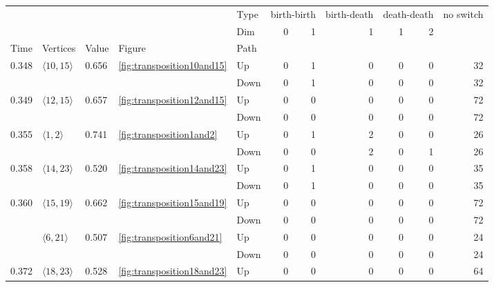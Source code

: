 \documentclass{article}
\begin{document}
\begin{center}
\begin{tabular}{lllllrrrrrr}
\toprule
 &  &  &  & Type & \multicolumn{2}{r}{birth-birth} & birth-death & \multicolumn{2}{r}{death-death} & no switch \\
 &  &  &  & Dim & 0 & 1 & 1 & 1 & 2 &  \\
Time & Vertices & Value & Figure & Path &  &  &  &  &  &  \\
\midrule
\multirow[t]{2}{*}{0.348} & \multirow[t]{2}{*}{$\langle10, 15\rangle$} & \multirow[t]{2}{*}{0.656} & \multirow[t]{2}{*}{\ref{fig:transposition10and15}} & Up & 0 & 1 & 0 & 0 & 0 & 32 \\
 &  &  &  & Down & 0 & 1 & 0 & 0 & 0 & 32 \\
\cline{1-11} \cline{2-11} \cline{3-11} \cline{4-11}
\multirow[t]{2}{*}{0.349} & \multirow[t]{2}{*}{$\langle12, 15\rangle$} & \multirow[t]{2}{*}{0.657} & \multirow[t]{2}{*}{\ref{fig:transposition12and15}} & Up & 0 & 0 & 0 & 0 & 0 & 72 \\
 &  &  &  & Down & 0 & 0 & 0 & 0 & 0 & 72 \\
\cline{1-11} \cline{2-11} \cline{3-11} \cline{4-11}
\multirow[t]{2}{*}{0.355} & \multirow[t]{2}{*}{$\langle1, 2\rangle$} & \multirow[t]{2}{*}{0.741} & \multirow[t]{2}{*}{\ref{fig:transposition1and2}} & Up & 0 & 1 & 2 & 0 & 0 & 26 \\
 &  &  &  & Down & 0 & 0 & 2 & 0 & 1 & 26 \\
\cline{1-11} \cline{2-11} \cline{3-11} \cline{4-11}
\multirow[t]{2}{*}{0.358} & \multirow[t]{2}{*}{$\langle14, 23\rangle$} & \multirow[t]{2}{*}{0.520} & \multirow[t]{2}{*}{\ref{fig:transposition14and23}} & Up & 0 & 1 & 0 & 0 & 0 & 35 \\
 &  &  &  & Down & 0 & 1 & 0 & 0 & 0 & 35 \\
\cline{1-11} \cline{2-11} \cline{3-11} \cline{4-11}
\multirow[t]{4}{*}{0.360} & \multirow[t]{2}{*}{$\langle15, 19\rangle$} & \multirow[t]{2}{*}{0.662} & \multirow[t]{2}{*}{\ref{fig:transposition15and19}} & Up & 0 & 0 & 0 & 0 & 0 & 72 \\
 &  &  &  & Down & 0 & 0 & 0 & 0 & 0 & 72 \\
\cline{2-11} \cline{3-11} \cline{4-11}
 & \multirow[t]{2}{*}{$\langle6, 21\rangle$} & \multirow[t]{2}{*}{0.507} & \multirow[t]{2}{*}{\ref{fig:transposition6and21}} & Up & 0 & 0 & 0 & 0 & 0 & 24 \\
 &  &  &  & Down & 0 & 0 & 0 & 0 & 0 & 24 \\
\cline{1-11} \cline{2-11} \cline{3-11} \cline{4-11}
\multirow[t]{2}{*}{0.372} & \multirow[t]{2}{*}{$\langle18, 23\rangle$} & \multirow[t]{2}{*}{0.528} & \multirow[t]{2}{*}{\ref{fig:transposition18and23}} & Up & 0 & 0 & 0 & 0 & 0 & 64 \\

\end{tabular}
\end{center}
\end{document}
